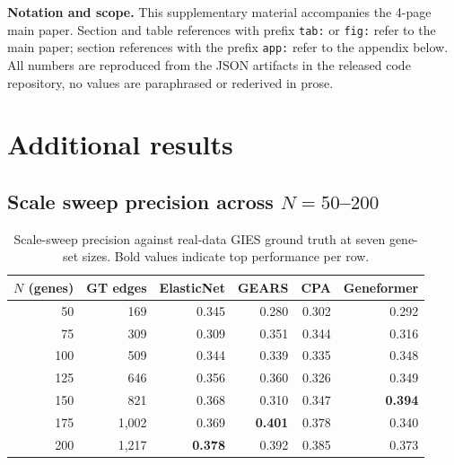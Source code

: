 \documentclass{article}
\begin{document}

\printAffiliationsAndNotice{}

\onecolumn
\appendix

\noindent\textbf{Notation and scope.} This supplementary material accompanies the 4-page main paper. Section and table references with prefix \texttt{tab:} or \texttt{fig:} refer to the main paper; section references with the prefix \texttt{app:} refer to the appendix below. All numbers are reproduced from the JSON artifacts in the released code repository, no values are paraphrased or rederived in prose.

\section{Additional results}

\subsection{Scale sweep precision across $N{=}50$--$200$}

\begin{table}[h]
\centering
\small
\begin{tabular}{rrrrrr}
\toprule
\textbf{$N$ (genes)} & \textbf{GT edges} & \textbf{ElasticNet} & \textbf{GEARS} & \textbf{CPA} & \textbf{Geneformer} \\
\midrule
50  & 169   & 0.345 & 0.280 & 0.302 & 0.292 \\
75  & 309   & 0.309 & 0.351 & 0.344 & 0.316 \\
100 & 509   & 0.344 & 0.339 & 0.335 & 0.348 \\
125 & 646   & 0.356 & 0.360 & 0.326 & 0.349 \\
150 & 821   & 0.368 & 0.310 & 0.347 & \textbf{0.394} \\
175 & 1{,}002 & 0.369 & \textbf{0.401} & 0.378 & 0.340 \\
200 & 1{,}217 & \textbf{0.378} & 0.392 & 0.385 & 0.373 \\
\bottomrule
\end{tabular}
\caption{Scale-sweep precision against real-data GIES ground truth at seven gene-set sizes. Bold values indicate top performance per row.}
\end{table}
\end{document}
